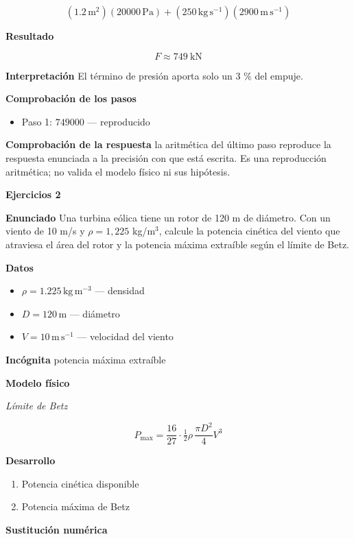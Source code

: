 \documentclass[10pt,openany]{book}
\begin{document}
\[
\left(1.2\,\mathrm{m}^{2}\right) \left(20000\,\mathrm{Pa}\right) + \left(250\,\mathrm{kg}\,\mathrm{s}^{-1}\right) \left(2900\,\mathrm{m}\,\mathrm{s}^{-1}\right)
\]

\noindent\textbf{Resultado}

\[
F \approx 749\ \mathrm{kN}
\]

\noindent\textbf{Interpretación}
El término de presión aporta solo un 3 \% del empuje.

\noindent\textbf{Comprobación de los pasos}
\begin{itemize}
\item Paso 1: $749000$ — reproducido
\end{itemize}

\noindent\textbf{Comprobación de la respuesta} la aritmética del último paso reproduce la respuesta enunciada a la precisión con que está escrita. Es una reproducción aritmética; no valida el modelo físico ni sus hipótesis.

\noindent\textbf{Ejercicios 2}

\noindent\textbf{Enunciado}
Una turbina eólica tiene un rotor de 120 m de diámetro. Con un viento de 10 m/s y \(\rho = 1{,}225\) kg/m\(^3\), calcule la potencia cinética del viento que atraviesa el área del rotor y la potencia máxima extraíble según el límite de Betz.

\noindent\textbf{Datos}
\begin{itemize}
\item $\rho = 1.225\,\mathrm{kg}\,\mathrm{m}^{-3}$ — densidad
\item $D = 120\,\mathrm{m}$ — diámetro
\item $V = 10\,\mathrm{m}\,\mathrm{s}^{-1}$ — velocidad del viento
\end{itemize}

\noindent\textbf{Incógnita}
potencia máxima extraíble

\noindent\textbf{Modelo físico}

\noindent\textit{Límite de Betz}

\[
P_{\max} = \frac{16}{27}\cdot\tfrac12\rho\,\frac{\pi D^{2}}{4}V^{3}
\]

\noindent\textbf{Desarrollo}
\begin{enumerate}
\item
Potencia cinética disponible
\item
Potencia máxima de Betz
\end{enumerate}

\noindent\textbf{Sustitución numérica}
\end{document}
